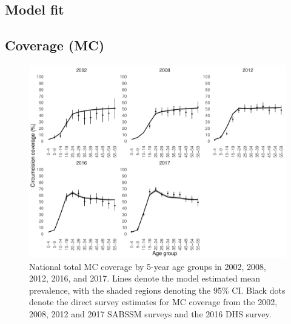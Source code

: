 \documentclass{article}
\begin{document}
\begin{appendix}

\section{Model fit}


\subsection{Coverage (MC)}


\begin{figure}[H]
	\centering
	\includegraphics[width = \linewidth]{Figures/suppmat/ModelFit/TotalPrev_5year_National_withsurveypoints}
	\caption{National total MC coverage by 5-year age groups in 2002, 2008, 2012, 2016, and 2017. Lines denote the model estimated mean prevalence, with the shaded regions denoting the 95\% CI. Black dots denote the direct survey estimates for MC coverage from the 2002, 2008, 2012 and 2017 SABSSM surveys and the 2016 DHS survey.}
\end{figure}


\end{appendix}
\end{document}
